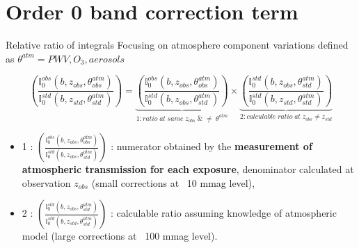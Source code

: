 \documentclass{beamer}
\begin{document}
\section{Order 0 band correction term}
\begin{frame}\sectionpage\end{frame}



\begin{frame}{Relative ratio of integrals}
Focusing on atmosphere component variations defined as
$\theta^{atm}= PWV, O_3, aerosols$
\begin{alertblock}{}
\begin{equation*}
\left(\frac{\mathbb{I}_0^{obs}(b,z_{obs},\theta_{obs}^{atm})}{\mathbb{I}_0^{std}(b,z_{std},\theta_{std}^{atm})}\right) =
\underbrace{\left(\frac{\mathbb{I}_0^{obs}(b,z_{obs},\theta_{obs}^{atm})}{\mathbb{I}_0^{std}(b,z_{obs},\theta_{std}^{atm})}\right)}_{1:ratio\;at \; same \; z_{obs}\; \& \; \neq \; \theta^{atm}} \times \underbrace{\left(\frac{\mathbb{I}_0^{std}(b,z_{obs},\theta_{std}^{atm})}{\mathbb{I}_0^{std}(b,z_{std},\theta_{std}^{atm})}\right)}_{2:calculable \; ratio \;at \; z_{obs}\neq z_{std} }
\end{equation*}
\end{alertblock}
\begin{itemize}
\item 1 : $\left(\frac{\mathbb{I}_0^{obs}(b,z_{obs},\theta_{obs}^{atm})}{\mathbb{I}_0^{std}(b,z_{obs},\theta_{std}^{atm})}\right)$ : numerator obtained by the {\bf measurement of atmospheric transmission for each exposure}, denominator calculated at observation $z_{obs}$ (small corrections at ~10 mmag level),
\item 2 : $\left(\frac{\mathbb{I}_0^{std}(b,z_{obs},\theta_{std}^{atm})}{\mathbb{I}_0^{std}(b,z_{std},\theta_{std}^{atm})}\right)$ : calculable ratio assuming knowledge of atmospheric model (large corrections at ~100 mmag level). 
\end{itemize}


\end{frame}
\end{document}
